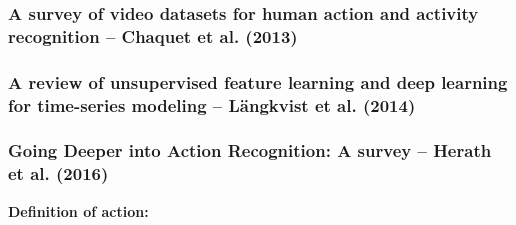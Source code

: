 \subsubsection{A survey of video datasets for human action and activity recognition -- Chaquet et al. (2013)}

\subsubsection{A review of unsupervised feature learning and deep learning for time-series modeling -- Längkvist et al. (2014)}

\subsubsection{Going Deeper into Action Recognition: A survey -- Herath et al. (2016)}

\textbf{Definition of action:} 

